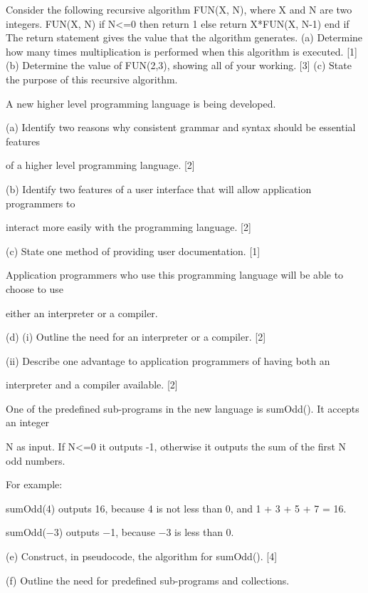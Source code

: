 
Consider the following recursive algorithm FUN(X, N), where X and N are two integers.
FUN(X, N)
if N<=0 then
return 1
else
return X*FUN(X, N-1)
end if
The return statement gives the value that the algorithm generates.
(a) Determine how many times multiplication is performed when this algorithm is executed. [1]
(b) Determine the value of FUN(2,3), showing all of your working. [3]
(c) State the purpose of this recursive algorithm.





A new higher level programming language is being developed.

(a) Identify two reasons why consistent grammar and syntax should be essential features

of a higher level programming language. [2]

(b) Identify two features of a user interface that will allow application programmers to

interact more easily with the programming language. [2]

(c) State one method of providing user documentation. [1]

Application programmers who use this programming language will be able to choose to use

either an interpreter or a compiler.

(d) (i) Outline the need for an interpreter or a compiler. [2]

(ii) Describe one advantage to application programmers of having both an

interpreter and a compiler available. [2]

One of the predefined sub-programs in the new language is sumOdd(). It accepts an integer

N as input. If N<=0 it outputs -1, otherwise it outputs the sum of the first N odd numbers.

For example:

sumOdd(4) outputs 16, because 4 is not less than 0, and 1 + 3 + 5 + 7 = 16.

sumOdd(−3) outputs −1, because −3 is less than 0.

(e) Construct, in pseudocode, the algorithm for sumOdd(). [4]

(f)	 Outline the need for predefined sub-programs and collections.






